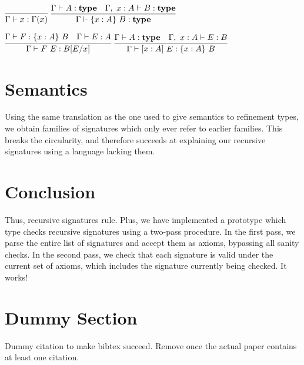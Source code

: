 \documentclass{article}
\begin{document}
\hspace*{\fill}
$\infer{\Gamma \entails x : \Gamma(x)}{}$
\hspace*{\fill}
$\infer{\Gamma \entails \{x:A\}~B : \type}{\Gamma \entails A : \type & \Gamma,~x:A \entails B : \type}$
\hspace*{\fill}

\hspace*{\fill}
$\infer{\Gamma \entails F~E : B[E/x]}{\Gamma \entails F : \{x:A\}~B & \Gamma \entails E : A}$
\hspace*{\fill}
$\infer{\Gamma \entails [x:A]~E : \{x:A\}~B}{\Gamma \entails A : \type & \Gamma,~x:A \entails E : B}$
\hspace*{\fill}

\section{Semantics}\label{Semantics}
Using the same translation as the one used to give semantics to refinement types, we obtain families of signatures which only ever refer to earlier families. This breaks the circularity, and therefore succeeds at explaining our recursive signatures using a language lacking them.

\section{Conclusion}\label{Conclusion}
Thus, recursive signatures rule. Plus, we have implemented a prototype which type checks recursive signatures using a two-pass procedure. In the first pass, we parse the entire list of signatures and accept them as axioms, bypassing all sanity checks. In the second pass, we check that each signature is valid under the current set of axioms, which includes the signature currently being checked. It works!

\section{Dummy Section}
Dummy citation \cite{kienzle2006challenge} to make bibtex succeed. Remove once the actual paper contains at least one citation.



\end{document}
